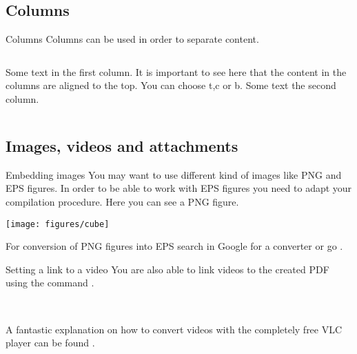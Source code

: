 \documentclass{beamer}
\begin{document}

\subsection{Columns}
\begin{frame}{Columns}
Columns can be used in order to separate content. \\[1cm]
\begin{columns}[t]
	Some text in the first column. It is important to see here that the content in the columns are aligned to the top. You can choose t,c or b.
	Some text the second column.
\end{columns}
\end{frame}


\subsection{Images, videos and attachments}
\begin{frame}{Embedding images}
You may want to use different kind of images like PNG and EPS figures. In order to be able to work with EPS figures you need to adapt your compilation procedure. Here you can see a PNG figure.
\begin{center}
	\texttt{[image: figures/cube]}
\end{center}
For conversion of PNG figures into EPS search in Google for a converter or go .
\end{frame}


\begin{frame}{Setting a link to a video}
You are also able to link videos to the created PDF using the command .
\begin{center}
	\qquad
	 \\[0.3cm]
	\qquad
\end{center}
A fantastic explanation on how to convert videos with the completely free VLC player can be found .
\end{frame}
\end{document}

